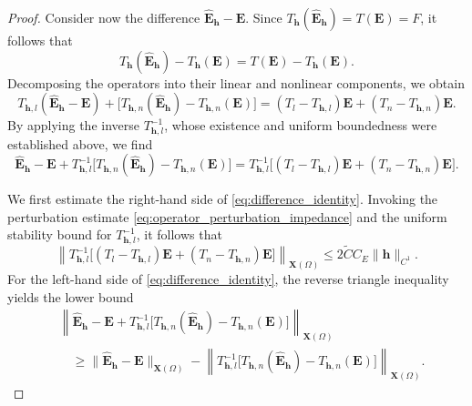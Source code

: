 \documentclass[12pt,reqno]{amsart}
\theoremstyle{definition}
\numberwithin{equation}{section}
\begin{document}
\begin{proof}
Consider now the difference $\hat{\mathbf E}_{\mathbf h} - \mathbf E$. Since $T_{\mathbf h}(\hat{\mathbf E}_{\mathbf h}) = T(\mathbf E) =  F$, it follows that
\[
T_{\mathbf h}(\hat{\mathbf E}_{\mathbf h}) - T_{\mathbf h}(\mathbf E) = T(\mathbf E) - T_{\mathbf h}(\mathbf E).
\]
Decomposing the operators into their linear and nonlinear components, we obtain
\[
T_{\mathbf h,l}(\hat{\mathbf E}_{\mathbf h} - \mathbf E) + \big[ T_{\mathbf h,n}(\hat{\mathbf E}_{\mathbf h}) - T_{\mathbf h,n}(\mathbf E) \big] = (T_l - T_{\mathbf h,l})\mathbf E + (T_n - T_{\mathbf h,n})\mathbf E.
\]
By applying the inverse $T_{\mathbf h,l}^{-1}$, whose existence and uniform boundedness were established above, we find
\begin{equation}\label{eq:difference_identity}
\hat{\mathbf E}_{\mathbf h} - \mathbf E + T_{\mathbf h,l}^{-1} \big[ T_{\mathbf h,n}(\hat{\mathbf E}_{\mathbf h}) - T_{\mathbf h,n}(\mathbf E) \big] = T_{\mathbf h,l}^{-1} \big[ (T_l - T_{\mathbf h,l})\mathbf E + (T_n - T_{\mathbf h,n})\mathbf E \big].
\end{equation}

We first estimate the right-hand side of \eqref{eq:difference_identity}. Invoking the perturbation estimate \eqref{eq:operator_perturbation_impedance} and the uniform stability bound for $T_{\mathbf h,l}^{-1}$, it follows that
\[
\left\| T_{\mathbf h,l}^{-1} \big[ (T_l - T_{\mathbf h,l})\mathbf E + (T_n - T_{\mathbf h,n})\mathbf E \big] \right\|_{\mathbf X(\Omega)} \le 2\widetilde{C} C_E \|\mathbf h\|_{C^1}.
\]
For the left-hand side of \eqref{eq:difference_identity}, the reverse triangle inequality yields the lower bound
\[
\begin{aligned}
&\left\| \hat{\mathbf E}_{\mathbf h} - \mathbf E + T_{\mathbf h,l}^{-1} \big[ T_{\mathbf h,n}(\hat{\mathbf E}_{\mathbf h}) - T_{\mathbf h,n}(\mathbf E) \big] \right\|_{\mathbf X(\Omega)} \\
&\quad \ge \|\hat{\mathbf E}_{\mathbf h} - \mathbf E\|_{\mathbf X(\Omega)} - \left\| T_{\mathbf h,l}^{-1} \big[ T_{\mathbf h,n}(\hat{\mathbf E}_{\mathbf h}) - T_{\mathbf h,n}(\mathbf E) \big] \right\|_{\mathbf X(\Omega)}.
\end{aligned}
\]



\end{proof}
\end{document}
